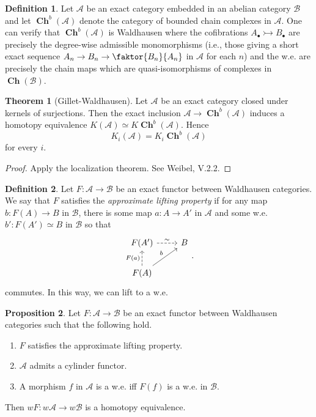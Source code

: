 \documentclass[10pt,letterpaper,cm]{nupset}
\theoremstyle{definition}
\newtheorem{definition}{Definition}
\theoremstyle{theorem}
\newtheorem{theorem}{Theorem}
\newtheorem{prop}[theorem]{Proposition}
\theoremstyle{remark}
\newcommand{\1}{\mathbf{1}}
\renewcommand{\a}{\mathscr{A}}
\renewcommand{\b}{\mathscr{B}}
\newcommand{\0}{\vec 0}
\DeclareMathOperator{\ch}{\mathbf{Ch}}
\begin{document}
\begin{definition}
Let $\a$ be an exact category embedded in an abelian category $\b$ and let $\ch^b(\a)$ denote the category of bounded chain complexes in $\a$. One can verify that $\ch^b(\a)$ is Waldhausen where the cofibrations $A_{\bullet} \rightarrowtail B_{\bullet}$ are precisely the degree-wise admissible monomorphisms (i.e., those giving a short exact sequence $A_n \to B_n \to \faktor{B_n}{A_n}$ in $\a$ for each $n$) and the w.e. are precisely the chain maps which are quasi-isomorphisms of complexes in $\ch(\b)$.
\end{definition}

\begin{theorem}[Gillet-Waldhausen]
Let $\a$ be an exact category closed under kernels of surjections. Then the exact inclusion $\a \to \ch^b(\a)$ induces a homotopy equivalence $K(\a) \simeq K\ch^b(\a)$. Hence $$K_i(\a) = K_i \ch^b(\a)$$ for every $i$.
\end{theorem}
\begin{proof}
Apply the localization theorem. See Weibel, V.2.2.
\end{proof}

\begin{definition}
Let $F: \a \to \b$ be an exact functor between Waldhausen categories. We say that $F$ satisfies the \textit{approximate lifting property} if for any map $b: F(A) \to B$ in $\b$, there is some map $a : A \to A'$ in $\a$ and some w.e. $b' : F(A') \simeq B$ in $\b$ so that
\[
\begin{tikzcd}
F(A') \arrow[r, "\sim", dashed] & B \\
F(A) \arrow[u, "F(a)", dashed] \arrow[ru, "b"] & 
\end{tikzcd}.
\]
commutes. In this way, we can lift to  a w.e.
\end{definition}

\begin{prop}
Let $F: \a \to \b$ be an exact functor between Waldhausen categories such that the following hold.
\begin{enumerate}
\item $F$ satisfies the approximate lifting property.
\item $\a$ admits a cylinder functor.
\item A morphism $f$ in $\a$ is a w.e. iff $F(f)$ is a w.e. in $\b$.
\end{enumerate}
Then $wF : w \a \to w\b$ is a homotopy equivalence.
\end{prop}
\end{document}
